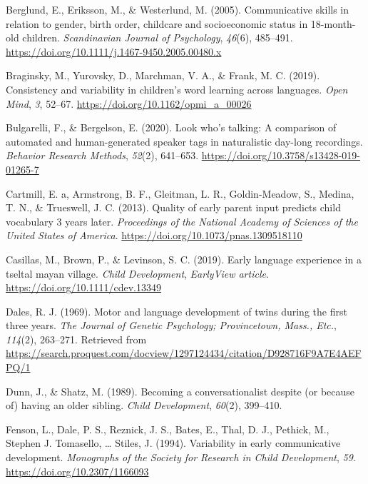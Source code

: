 \documentclass[
  english,
  man,floatsintext]{apa6}
\begin{document}
\leavevmode\hypertarget{ref-berglund_communicative_2005}{}%
Berglund, E., Eriksson, M., \& Westerlund, M. (2005). Communicative skills in relation to gender, birth order, childcare and socioeconomic status in 18-month-old children. \emph{Scandinavian Journal of Psychology}, \emph{46}(6), 485--491. \url{https://doi.org/10.1111/j.1467-9450.2005.00480.x}

\leavevmode\hypertarget{ref-braginsky_consistency_2019}{}%
Braginsky, M., Yurovsky, D., Marchman, V. A., \& Frank, M. C. (2019). Consistency and variability in children's word learning across languages. \emph{Open Mind}, \emph{3}, 52--67. \url{https://doi.org/10.1162/opmi_a_00026}

\leavevmode\hypertarget{ref-bulgarelli_look_2020}{}%
Bulgarelli, F., \& Bergelson, E. (2020). Look who's talking: A comparison of automated and human-generated speaker tags in naturalistic day-long recordings. \emph{Behavior Research Methods}, \emph{52}(2), 641--653. \url{https://doi.org/10.3758/s13428-019-01265-7}

\leavevmode\hypertarget{ref-cartmill_quality_2013}{}%
Cartmill, E. a, Armstrong, B. F., Gleitman, L. R., Goldin-Meadow, S., Medina, T. N., \& Trueswell, J. C. (2013). Quality of early parent input predicts child vocabulary 3 years later. \emph{Proceedings of the National Academy of Sciences of the United States of America}. \url{https://doi.org/10.1073/pnas.1309518110}

\leavevmode\hypertarget{ref-casillas_early_2019}{}%
Casillas, M., Brown, P., \& Levinson, S. C. (2019). Early language experience in a tseltal mayan village. \emph{Child Development}, \emph{EarlyView article}. \url{https://doi.org/10.1111/cdev.13349}

\leavevmode\hypertarget{ref-dales_motor_1969}{}%
Dales, R. J. (1969). Motor and language development of twins during the first three years. \emph{The Journal of Genetic Psychology; Provincetown, Mass., Etc.}, \emph{114}(2), 263--271. Retrieved from \url{https://search.proquest.com/docview/1297124434/citation/D928716F9A7E4AEFPQ/1}

\leavevmode\hypertarget{ref-dunn_becoming_1989}{}%
Dunn, J., \& Shatz, M. (1989). Becoming a conversationalist despite (or because of) having an older sibling. \emph{Child Development}, \emph{60}(2), 399--410.

\leavevmode\hypertarget{ref-fenson_variability_1994}{}%
Fenson, L., Dale, P. S., Reznick, J. S., Bates, E., Thal, D. J., Pethick, M., Stephen J. Tomasello, \ldots{} Stiles, J. (1994). Variability in early communicative development. \emph{Monographs of the Society for Research in Child Development}, \emph{59}. \url{https://doi.org/10.2307/1166093}
\end{document}
